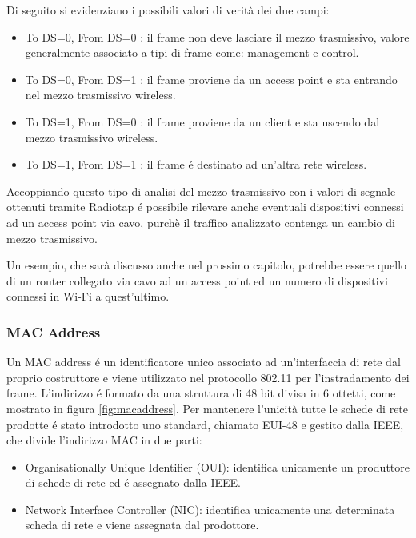 Di seguito si evidenziano i possibili valori di verit\`a dei due campi:

\begin{itemize}
	\item To DS=0, From DS=0 : il frame non deve lasciare il mezzo trasmissivo, valore generalmente associato a tipi di frame come: management e control.
	\item To DS=0, From DS=1 : il frame proviene da un access point e sta entrando nel mezzo trasmissivo wireless.
	\item To DS=1, From DS=0 : il frame proviene da un client e sta uscendo dal mezzo trasmissivo wireless.
	\item To DS=1, From DS=1 : il frame \'e destinato ad un'altra rete wireless.
\end{itemize}

Accoppiando questo tipo di analisi del mezzo trasmissivo con i valori di segnale ottenuti tramite Radiotap \'e possibile rilevare anche eventuali dispositivi connessi ad un access point via cavo, purch\`e il traffico analizzato contenga un cambio di mezzo trasmissivo.

Un esempio, che sar\`a discusso anche nel prossimo capitolo, potrebbe essere quello di un router collegato via cavo ad un access point ed un numero di dispositivi connessi in Wi-Fi a quest'ultimo.

\newpage

\subsubsection{MAC Address}

Un MAC address \'e un identificatore unico associato ad un'interfaccia di rete dal proprio costruttore e viene utilizzato nel protocollo 802.11 per l'instradamento dei frame.
L'indirizzo \'e formato da una struttura di 48 bit divisa in 6 ottetti, come mostrato in figura \ref{fig:macaddress}.
Per mantenere l'unicit\`a tutte le schede di rete prodotte \'e stato introdotto uno standard, chiamato EUI-48 e gestito dalla IEEE, che divide l'indirizzo MAC in due parti:
\begin{itemize}
	\item Organisationally Unique Identifier (OUI): identifica unicamente un produttore di schede di rete ed \'e assegnato dalla IEEE.
	\item Network Interface Controller (NIC): identifica unicamente una determinata scheda di rete e viene assegnata dal prodottore.
\end{itemize}

